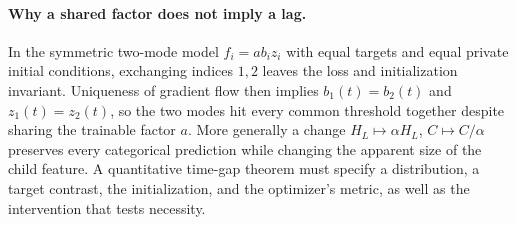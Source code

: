 \paragraph{Why a shared factor does not imply a lag.}
In the symmetric two-mode model $f_i=a b_i z_i$ with equal targets and
equal private initial conditions, exchanging indices $1,2$ leaves the
loss and initialization invariant. Uniqueness of gradient flow then
implies $b_1(t)=b_2(t)$ and $z_1(t)=z_2(t)$, so the two modes hit every
common threshold together despite sharing the trainable factor $a$.
More generally a change $H_L\mapsto \alpha H_L$, $C\mapsto C/\alpha$
preserves every categorical prediction while changing the apparent
size of the child feature. A quantitative time-gap theorem must specify
a distribution, a target contrast, the initialization, and the optimizer's
metric, as well as the intervention that tests necessity.
